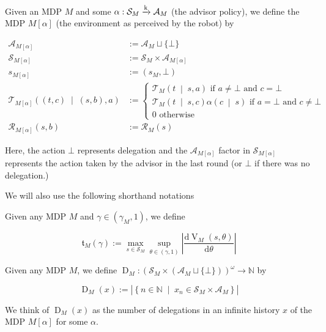 \documentclass[anon,12pt]{colt2018} %
\newcommand{\AP}[1]{\left(#1\right)}
\newcommand{\APM}[2]{\left(#1\;\middle\vert\;#2\right)}
\newcommand{\ACM}[2]{\left\{#1\;\middle\vert\;#2\right\}}
\newcommand{\D}{\mathrm{d}}
\newcommand{\Nats}{\mathbb{N}}
\newcommand{\Abs}[1]{\left\vert #1 \right\vert}
\newcommand{\K}{\xrightarrow{\textnormal{k}}}
\newcommand{\A}{\mathcal{A}}
\newcommand{\St}{\mathcal{S}}
\newcommand{\T}{\mathcal{T}}
\newcommand{\R}{\mathcal{R}}
\newcommand{\V}{\operatorname{V}}
\newcommand{\Tn}{\mathfrak{t}}
\newcommand{\Ad}{\alpha}
\newcommand{\ND}{\operatorname{D}}
\begin{document}
\begin{samepage}
\begin{definition}

Given an MDP $M$ and some $\Ad: \St_M \K \A_M$ (the advisor policy), we define the MDP $M[\Ad]$ (the environment as perceived by the robot) by

\begin{align}
\A_{M[\Ad]}&:=\A_M \sqcup \{\bot\} \\
\St_{M[\Ad]}&:=\St_M \times \A_{M[\Ad]} \\ 
s_{M[\Ad]}&:=\AP{s_M,\bot} \\
\T_{M[\Ad]}\APM{\AP{t,c}}{\AP{s,b},a}&:=\begin{cases} \T_M\APM{t}{s,a} \text{ if } a\ne\bot \text{ and } c=\bot \\ \T_M\APM{t}{s,c}\Ad\APM{c}{s} \text{ if } a = \bot \text{ and } c\ne\bot \\ 0 \text{ otherwise} \end{cases} \\
\R_{M[\Ad]}(s,b)&:= \R_M(s)
\end{align}

Here, the action $\bot$ represents delegation and the $\A_{M[\Ad]}$ factor in $\St_{M[\Ad]}$ represents the action taken by the advisor in the last round (or $\bot$ if there was no delegation.)

\end{definition}
\end{samepage}

We will also use the following shorthand notations

\begin{samepage}
\begin{definition}

Given any MDP $M$ and $\gamma\in\AP{\gamma_M,1}$, we define

\begin{equation}
\Tn_{M}(\gamma):=\max_{s \in \St_M} \sup_{\theta\in(\gamma,1)} \Abs{\frac{\D{\V_{M}(s,\theta)}}{\D{\theta}}}
\end{equation}

\end{definition}
\end{samepage}

\begin{samepage}
\begin{definition}

Given any MDP $M$, we define $\ND_M: \AP{\St_M \times \AP{\A_M \sqcup \{\bot\}}}^\omega \rightarrow \Nats$ by

\begin{equation}
\ND_M(x) := \Abs{\ACM{n\in\Nats}{x_n\in\St_M\times\A_M}} 
\end{equation}

We think of $\ND_M(x)$ as the number of delegations in an infinite history $x$ of the MDP $M[\alpha]$ for some $\alpha$.

\end{definition}
\end{samepage}
\end{document}

